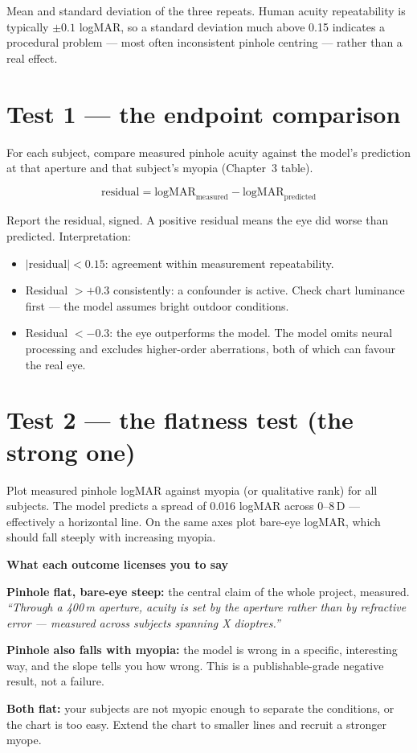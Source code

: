 \documentclass[11pt]{report}
\newenvironment{keybox}[1]%
{\par\vspace{8pt}\begin{lrbox}{\kbsave}\begin{minipage}{0.88\textwidth}%
{\bfseries\color{hbblue}#1}\par\vspace{4pt}\ignorespaces}%
{\end{minipage}\end{lrbox}%
\begin{center}\setlength{\fboxrule}{1.2pt}\setlength{\fboxsep}{8pt}%
\fcolorbox{hbblue}{boxgrey}{\usebox{\kbsave}}\end{center}\vspace{8pt}\par}
\begin{document}
Mean and standard deviation of the three repeats. Human acuity repeatability is typically
$\pm0.1$ logMAR, so a standard deviation much above 0.15 indicates a procedural problem --- most
often inconsistent pinhole centring --- rather than a real effect.

\section{Test 1 --- the endpoint comparison}

For each subject, compare measured pinhole acuity against the model's prediction at that aperture
and that subject's myopia (Chapter~3 table).

\begin{equation}
\text{residual} = \text{logMAR}_{\text{measured}} - \text{logMAR}_{\text{predicted}}
\end{equation}

Report the residual, signed. A positive residual means the eye did worse than predicted. Interpretation:

\begin{itemize}[leftmargin=1.2cm]
\item $|{\text{residual}}| < 0.15$: agreement within measurement repeatability.
\item Residual $> +0.3$ consistently: a confounder is active. Check chart luminance first --- the model
assumes bright outdoor conditions.
\item Residual $< -0.3$: the eye outperforms the model. The model omits neural processing and
excludes higher-order aberrations, both of which can favour the real eye.
\end{itemize}

\section{Test 2 --- the flatness test (the strong one)}

Plot measured pinhole logMAR against myopia (or qualitative rank) for all subjects. The model
predicts a spread of 0.016 logMAR across 0--8\,D --- effectively a horizontal line. On the same axes
plot bare-eye logMAR, which should fall steeply with increasing myopia.

\begin{keybox}{What each outcome licenses you to say}
\textbf{Pinhole flat, bare-eye steep:} the central claim of the whole project, measured. \emph{``Through
a 400\,\textmu m aperture, acuity is set by the aperture rather than by refractive error --- measured
across subjects spanning X dioptres.''}

\textbf{Pinhole also falls with myopia:} the model is wrong in a specific, interesting way, and the
slope tells you how wrong. This is a publishable-grade negative result, not a failure.

\textbf{Both flat:} your subjects are not myopic enough to separate the conditions, or the chart is
too easy. Extend the chart to smaller lines and recruit a stronger myope.
\end{keybox}
\end{document}
